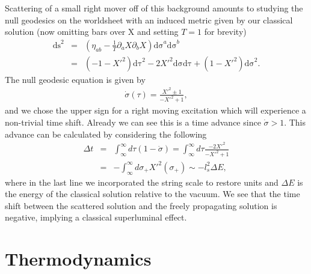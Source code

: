 \documentclass[%
 reprint,
 amsmath,amssymb,
 aps,
]{revtex4-1}
\begin{document}
Scattering of a small right mover off of this background amounts to studying the null geodesics
on the worldsheet with an induced metric given by our classical solution (now omitting bars over
X and setting $T = 1$ for brevity)
\begin{eqnarray}
    \mathrm{ds}^2 &=& \left( \eta_{a b} - \frac{1}{T} \partial_a X \partial_b X \right)
    \mathrm{d\sigma}^a \mathrm{d\sigma}^b \nonumber \\ &=& (-1-X'^2)\mathrm{d \tau}^2 - 2 X'^2 \mathrm{d \sigma}
    \mathrm{d \tau} + (1 - X'^2) \mathrm{d \sigma}^2 \nonumber .
\end{eqnarray}
The null geodesic equation is given by
\begin{eqnarray}
    \dot{\sigma}(\tau) = \frac{X'^2 \pm 1}{-X'^2 + 1} \nonumber ,
\end{eqnarray}
and we chose the upper sign for a right moving excitation which will experience a non-trivial time
shift. Already we can see this is a time advance since $\dot{\sigma} > 1$.  This advance can be
calculated by considering the following
\begin{eqnarray}
    \Delta t &=& \int_{\infty}^{\infty} d\tau (1 - \dot{\sigma}) = \int_{\infty}^{\infty} d\tau \frac{-2
    X'^2}{-X'^2 + 1} \nonumber \\
    &=& - \int_{\infty}^{\infty} d\sigma_+ X'^2 (\sigma_+) \sim -l_s^2 \Delta E , \nonumber
\end{eqnarray}
where in the last line we incorporated the string scale to restore units and $\Delta E$ is the
energy of the classical solution relative to the vacuum. We see that the time shift between the
scattered solution and the freely propagating solution is negative, implying a classical
superluminal effect.

\section{Thermodynamics}
\end{document}
